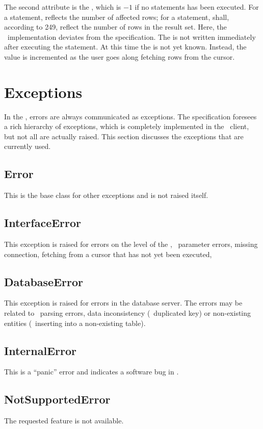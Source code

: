 The second attribute is the , which
is $-1$ if no statements has been executed.
For a  statement, 
reflects the number of affected rows;
for a  statement,  shall,
according to  249, reflect
the number of rows in the result set.
Here, the \nowdb\ implementation deviates from the specification.
The  is not written immediately after
executing the statement. At this time the 
is not yet known. Instead, the value is incremented
as the user goes along fetching rows from the cursor.

\section{Exceptions}
In the , errors are  always
communicated as exceptions. The specification
foresees a rich hierarchy of exceptions, which
is completely implemented in the \nowdb\ client,
but not all are actually raised. This section
discusses the exceptions that are currently used.

\subsection{Error}
This is the base class for other exceptions
and is not raised itself.

\subsection{InterfaceError}
This exception is raised for errors on the level
of the , \eg\ parameter errors, missing
connection, fetching from a cursor that has not yet been executed, \etc\

\subsection{DatabaseError}
This exception is raised for errors in the database server.
The errors may be related to \sql\ parsing errors,
data inconsistency (\eg\ duplicated key) or non-existing
entities (\eg\ inserting into a non-existing table).

\subsection{InternalError}
This is a ``panic'' error and indicates a software bug in \nowdb.

\subsection{NotSupportedError}
The requested feature is not available.

